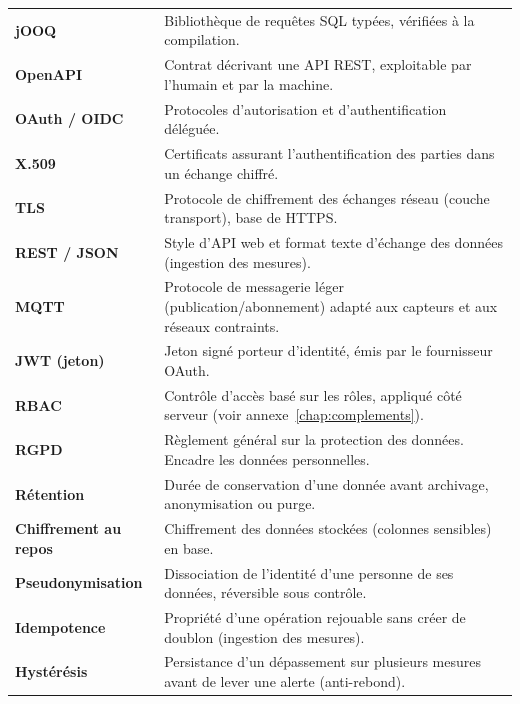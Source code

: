 \begin{xltabular}{\textwidth}{>{\bfseries}p{4cm} X}
jOOQ & Bibliothèque de requêtes SQL typées, vérifiées à la compilation. \\
OpenAPI & Contrat décrivant une API REST, exploitable par l'humain et par la machine. \\
OAuth / OIDC & Protocoles d'autorisation et d'authentification déléguée. \\
X.509 & Certificats assurant l'authentification des parties dans un échange chiffré. \\
TLS & Protocole de chiffrement des échanges réseau (couche transport), base de HTTPS. \\
REST / JSON & Style d'API web et format texte d'échange des données (ingestion des mesures). \\
MQTT & Protocole de messagerie léger (publication/abonnement) adapté aux capteurs et aux réseaux contraints. \\
JWT (jeton) & Jeton signé porteur d'identité, émis par le fournisseur OAuth. \\
RBAC & Contrôle d'accès basé sur les rôles, appliqué côté serveur (voir annexe~\ref{chap:complements}). \\
RGPD & Règlement général sur la protection des données. Encadre les données personnelles. \\
Rétention & Durée de conservation d'une donnée avant archivage, anonymisation ou purge. \\
Chiffrement au repos & Chiffrement des données stockées (colonnes sensibles) en base. \\
Pseudonymisation & Dissociation de l'identité d'une personne de ses données, réversible sous contrôle. \\
Idempotence & Propriété d'une opération rejouable sans créer de doublon (ingestion des mesures). \\
Hystérésis & Persistance d'un dépassement sur plusieurs mesures avant de lever une alerte (anti-rebond). \\
\bottomrule
\end{xltabular}

